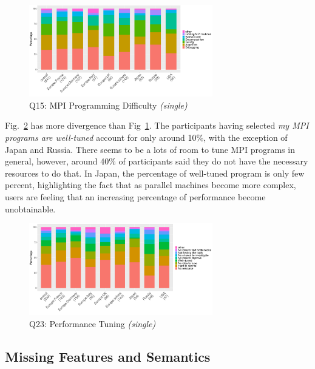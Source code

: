 \documentclass[preprint,5p,times]{elsarticle}
\def\myquote#1{{\it #1}}
\def\countries{contributors\xspace{}}%
\begin{document}
\begin{figure}[htb]
\begin{center}
\includegraphics[width=8.0cm]{R-scripts/Q15.pdf}
\vspace{-2mm}
\caption{Q15: MPI Programming Difficulty {\it(single)}}
\label{fig:difficulty}
\end{center}
\end{figure}

Fig.~\ref{fig:tuning} has more divergence than Fig~\ref{fig:difficulty}. The
participants having selected \myquote{my MPI programs are well-tuned} account
for only around 10\%, with the exception of Japan and Russia. There seems to be
a lots of room to tune MPI programs in general, however, around 40\% of
participants said they do not have the necessary resources to do that. In Japan,
the percentage of well-tuned program is only few percent, highlighting the fact
that as parallel machines become more complex, users are feeling that an
increasing percentage of performance become unobtainable.

\begin{figure}[htb]
\begin{center}
\includegraphics[width=8.0cm]{R-scripts/Q23.pdf}
\vspace{-2mm}
\caption{Q23: Performance Tuning {\it(single)}}
\label{fig:tuning}
\end{center}
\end{figure}

\subsection{Missing Features and Semantics}
\end{document}
